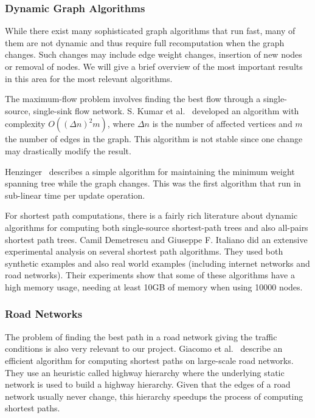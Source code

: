 \subsubsection{Dynamic Graph Algorithms}

While there exist many sophisticated graph algorithms that run fast, many of them are not dynamic and thus require full recomputation when the graph changes. Such changes may include edge weight changes, insertion of new nodes or removal of nodes. We will give a brief overview of the most important results in this area for the most relevant algorithms.

The maximum-flow problem involves finding the best flow through a single-source, single-sink flow network.
S. Kumar et al.~\cite{maxflow} developed an algorithm with complexity $O((\Delta n)^{2}m)$, where $\Delta n$ is the number of affected vertices and $m$ the number of edges in the graph. This algorithm is not stable since one change may drastically modify the result.

Henzinger~\cite{Henzinger97maintainingminimum} describes a simple algorithm for maintaining the minimum weight spanning tree while the graph changes. This was the first algorithm that run in sub-linear time per update operation.

For shortest path computations, there is a fairly rich literature about dynamic algorithms for computing both single-source shortest-path trees and also all-pairs shortest path trees. Camil Demetrescu and Giuseppe F. Italiano did an extensive experimental analysis \cite{Demetrescu04experimentalanalysis} on several shortest path algorithms. They used both synthetic examples and also real world examples (including internet networks and road networks). Their experiments show that some of these algorithms have a high memory usage, needing at least 10GB of memory when using 10000 nodes.

\subsubsection{Road Networks}

The problem of finding the best path in a road network giving the traffic conditions is also very relevant to our project.
Giacomo et al.~\cite{DBLP:journals/corr/abs-0704-1068} describe an efficient algorithm for computing shortest paths on large-scale road networks. They use an heuristic called highway hierarchy where the underlying static network is used to build a highway hierarchy. Given that the edges of a road network usually never change, this hierarchy speedups the process of computing shortest paths.

